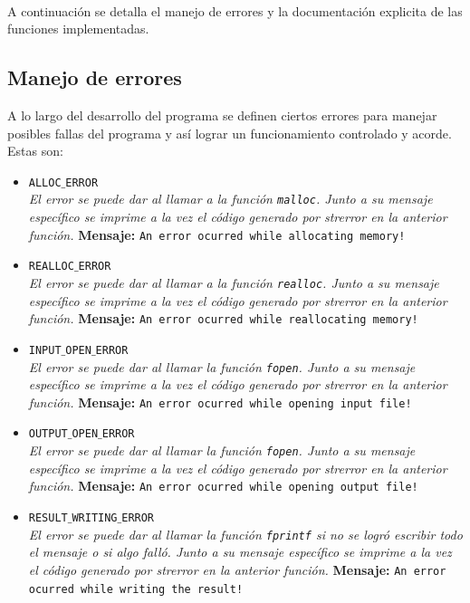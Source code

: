 \documentclass[a4paper, 10pt]{article}
\def\code#1{\texttt{#1}}
\begin{document}
			\\
			A continuación se detalla el manejo de errores y la documentación explicita de las funciones implementadas.
		
		\subsection{Manejo de errores}
			A lo largo del desarrollo del programa se definen ciertos errores para manejar posibles fallas del
			programa y así lograr un funcionamiento controlado y acorde. Estas son:
			\begin{itemize}

				\item \code{ALLOC$\_$ERROR}
				\\\textit{El error se puede dar al llamar a la función \code{malloc}.
				Junto a su mensaje específico se imprime a la vez el código generado por strerror en
				la anterior función.}
					\subitem \textbf{Mensaje:}
						\subsubitem \code{An error ocurred while allocating memory!}

				\item \code{REALLOC$\_$ERROR}
				\\\textit{El error se puede dar al llamar a la función \code{realloc}.
				Junto a su mensaje específico se imprime a la vez el código generado por strerror en
				la anterior función.}
					\subitem \textbf{Mensaje:}
						\subsubitem \code{An error ocurred while reallocating memory!}

				\item \code{INPUT$\_$OPEN$\_$ERROR}
				\\\textit{El error se puede dar al llamar la función \code{fopen}.
				Junto a su mensaje específico se imprime a la vez el código generado por strerror en
				la anterior función.}
					\subitem \textbf{Mensaje:}
						\subsubitem \code{An error ocurred while opening input file!}

				\item \code{OUTPUT$\_$OPEN$\_$ERROR}
				\\\textit{El error se puede dar al llamar la función \code{fopen}.
				Junto a su mensaje específico se imprime a la vez el código generado por strerror en
				la anterior función.}
					\subitem \textbf{Mensaje:}
						\subsubitem \code{An error ocurred while opening output file!}

				\item \code{RESULT$\_$WRITING$\_$ERROR}
				\\\textit{El error se puede dar al llamar la función \code{fprintf}
				si no se logró escribir todo el mensaje o si algo falló.
				Junto a su mensaje específico se imprime a la vez el código generado por strerror en
				la anterior función.}
					\subitem \textbf{Mensaje:}
						\subsubitem \code{An error ocurred while writing the result!}


\end{itemize}
\end{document}
